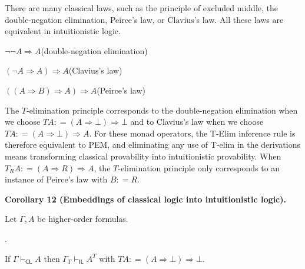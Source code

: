\documentclass[10pt,a4paper]{article}
\begin{document}
 
 
There are many classical laws, such as the principle of excluded middle, the double-negation elimination, Peirce’s law, or Clavius’s law. All these laws are equivalent in intuitionistic logic.\par
  
\par  \quad  $\displaystyle\neg\neg A\mathbin{\Rightarrow}A$\quad  \quad  (double-negation elimination)\quad  
 
\par  \quad  $\displaystyle(\neg A\mathbin{\Rightarrow}A)\mathbin{\Rightarrow}A$\quad  \quad  (Clavius’s law)\quad  
 
\par  \quad  $\displaystyle((A\mathbin{\Rightarrow}B)\mathbin{\Rightarrow}A)\mathbin{\Rightarrow}A$\quad  \quad  (Peirce’s law)\quad  
  
The $T$-elimination principle corresponds to the double-negation elimination when we choose $TA\mathrel{\mathop{:}}=(A\mathbin{\Rightarrow}\bot)\mathbin{\Rightarrow}\bot$ and to Clavius’s law when we choose $TA\mathrel{\mathop{:}}=(A\mathbin{\Rightarrow}\bot)\mathbin{\Rightarrow}A$. For these monad operators, the T-Elim inference rule is therefore equivalent to PEM, and eliminating any use of T-elim in the derivations means transforming classical provability into intuitionistic provability. When $T_{R}A\mathrel{\mathop{:}}=(A\mathbin{\Rightarrow}R)\mathbin{\Rightarrow}A$, the $T$-elimination principle only corresponds to an instance of Peirce’s law with $B\mathrel{\mathop{:}}=R$.\par
 
 
 
\par\medskip\noindent\textbf{Corollary 12 (Embeddings of classical logic into intuitionistic logic).}\par
 
 
Let $\Gamma,A$ be higher-order formulas.\par
  
\par{}. 
 
If $\Gamma\vdash_{\mathsf{CL}}A$ then $\Gamma_{T}\vdash_{\mathsf{IL}}A^{T}$ with $TA\mathrel{\mathop{:}}=(A\mathbin{\Rightarrow}\bot)\mathbin{\Rightarrow}\bot$.\par
 
\end{document}

